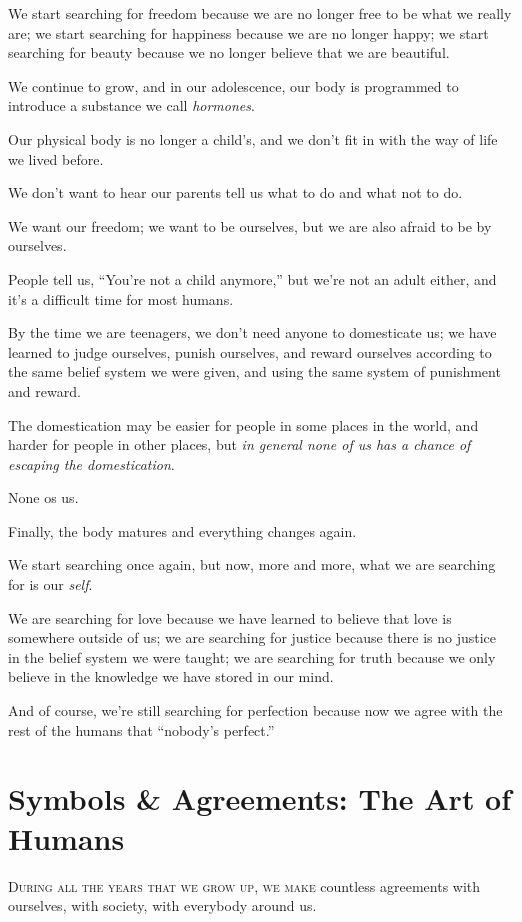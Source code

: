 \documentclass{article}
\numberwithin{equation}{section}
\begin{document}
We start searching for freedom because we are no longer free to be what we really are; we start searching for happiness because we are no longer happy; we start searching for beauty because we no longer believe that we are beautiful.

%
We continue to grow, and in our adolescence, our body is programmed to introduce a substance we call \textit{hormones}.

Our physical body is no longer a child's, and we don't fit in with the way of life we lived before.

We don't want to hear our parents tell us what to do and what not to do.

We want our freedom; we want to be ourselves, but we are also afraid to be by ourselves.

People tell us, ``You're not a child anymore,'' but we're not an adult either, and it's a difficult time for most humans.

By the time we are teenagers, we don't need anyone to domesticate us; we have learned to judge ourselves, punish ourselves, and reward ourselves according to the same belief system we were given, and using the same system of punishment and reward.

The domestication may be easier for people in some places in the world, and harder for people in other places, but \textit{in general none of us has a chance of escaping the domestication}.

None os us.

Finally, the body matures and everything changes again.

We start searching once again, but now, more and more, what we are searching for is our \textit{self}.

We are searching for love because we have learned to believe that love is somewhere outside of us; we are searching for justice because there is no justice in the belief system we were taught; we are searching for truth because we only believe in the knowledge we have stored in our mind.

And of course, we're still searching for perfection because now we agree with the rest of the humans that ``nobody's perfect.''

\section{Symbols \& Agreements: The Art of Humans}
\textsc{During all the years that we grow up, we make} countless agreements with ourselves, with society, with everybody around us.
\end{document}
